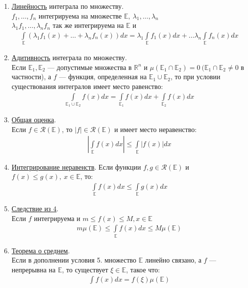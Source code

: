 \begin{enumerate}
  \item \underline{Линейность} интеграла по множеству. \\
    $f_1, \dots, f_n$ интегрируема на множестве $\mathbb{E}, \ \lambda_1, \dots, \lambda_n$
    \\
    $\lambda_1 f_1, \dots, \lambda_n f_n$ так же интегрируема на $\mathbb{E}$ и
    \begin{gather*}
      \int\limits_{\mathbb{E}} \left(\lambda_1 f_1(x) + \dots + \lambda_n
      f_n(x) \right) dx = \lambda_1 \int\limits_{\mathbb{E}} f_1(x) dx + \dots
      \lambda_n \int\limits_\mathbb{E} f_n(x) dx
    \end{gather*}
  \item \underline{Адитивность} интеграла по множеству. \\
    Если $\mathbb{E}_1, \mathbb{E}_2$ --- допустимые множества в $\mathbb{R}^n$
    и $\mu(\mathbb{E}_1 \cap \mathbb{E}_2) = 0 \ (\mathbb{E}_1 \cap \mathbb{E}_2
    \not = 0$ в частности), а $f$ --- функция, определенная на $\mathbb{E}_1
    \cup \mathbb{E}_2$, то при условии существования интегралов имеет место
    равенство:
    \begin{gather*}
      \int\limits_{\mathbb{E}_1 \cup \mathbb{E}_2} f(x) dx =
      \int\limits_{\mathbb{E}_1} f(x) dx + \int\limits_{\mathbb{E}_2} f(x) dx
    \end{gather*}
  \item \underline{Общая оценка}. \\
    Если $f \in \mathcal{R}(\mathbb{E})$, то $|f| \in \mathcal{R}(\mathbb{E})$ и имеет место
    неравенство:
    \begin{gather*}
      \left| \int\limits_{\mathbb{E}} f(x) dx \right| \leq
      \int\limits_{\mathbb{E}} |f(x)| dx
    \end{gather*}
  \item \underline{Интегрирование неравенств}.
    Если функции $f, g \in \mathcal{R}(\mathbb{E})$ и $f(x) \leq g(x), \ x \in
    \mathbb{E}$, то:
    \begin{gather*}
      \int\limits_\mathbb{E} f(x) dx \leq \int\limits_\mathbb{E} g(x) dx
    \end{gather*}
  \item \underline{Следствие из 4}. \\
    Если $f$ интегрируема и $m \leq f(x) \leq M, x \in \mathbb{E}$
    \begin{gather*}
      m\mu(\mathbb{E}) \leq \int\limits_\mathbb{E} f(x)dx \leq M\mu(\mathbb{E})
    \end{gather*}
  \item \underline{Теорема о среднем}. \\
    Если в дополнении условия 5. множество $\mathbb{E}$ линейно связано, а $f$
    --- непрерывна на $\mathbb{E}$, то существует $\xi \in \mathbb{E}$, такое
    что:
    \begin{gather*}
      \int f(x) dx = f(\xi) \mu(\mathbb{E})
    \end{gather*}
\end{enumerate}

